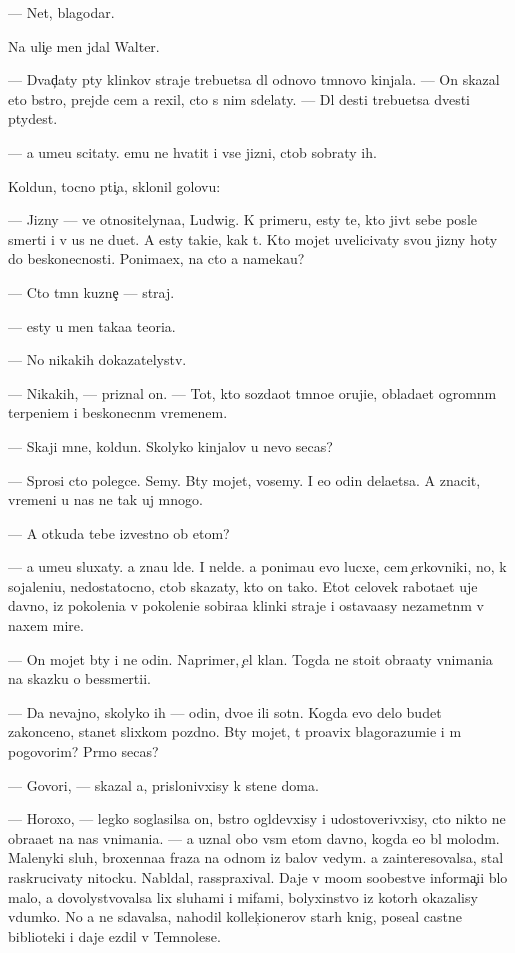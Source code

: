 \documentclass[10pt]{book}
\begin{document}
— Net, blagodar{\iu}.

Na uli{\c}e men{\ia} jdal Walter.

— Dvad{\c}aty p{\ia}ty klinkov straje{\y} trebu{\y}etsa dl{\ia} odnovo t{\e}mnovo kinjala. — On skazal eto b{\yi}stro, prejde cem {\y}a rexil, cto s nim sdelaty. — Dl{\ia} des{\ia}ti trebu{\y}etsa dvesti p{\ia}tydes{\ia}t.

— {\Y}a ume{\y}u scitaty. {\Y}emu ne hvatit i vse{\y} jizni, ctob{\yi} sobraty ih.

Koldun, tocno pti{\c}a, sklonil golovu:

— Jizny — ve{\x} otnositelyna{\y}a, Ludwig. K primeru, {\y}esty te, kto jiv{\e}t sebe posle smerti i v us ne du{\y}et. A {\y}esty taki{\y}e, kak t{\yi}. Kto mojet uvelicivaty svo{\y}u jizny hoty do beskonecnosti. Ponima{\y}ex, na cto {\y}a nameka{\y}u?

— Cto t{\e}mn{\yi}{\y} kuzne{\c} — straj.

— {\Y}esty u men{\ia} taka{\y}a teori{\y}a.

— No nikakih dokazatelystv.

— Nikakih, — priznal on. — Tot, kto sozda{\y}ot t{\e}mno{\y}e oruji{\y}e, oblada{\y}et ogromn{\yi}m terpeni{\y}em i beskonecn{\yi}m vremenem.

— Skaji mne, koldun. Skolyko kinjalov u nevo se{\y}cas?

— Sprosi cto polegce. Semy. B{\yi}ty mojet, vosemy. I {\y}e{\x}o odin dela{\y}etsa. A znacit, vremeni u nas ne tak uj mnogo.

— A otkuda tebe izvestno ob etom?

— {\Y}a ume{\y}u sluxaty. {\Y}a zna{\y}u l{\iu}de{\y}. I nel{\iu}de{\y}. {\Y}a ponima{\y}u {\y}evo lucxe, cem {\c}erkovniki, no, k sojaleni{\y}u, nedostatocno, ctob{\yi} skazaty, kto on tako{\y}. Etot celovek rabota{\y}et uje davno, iz pokoleni{\y}a v pokoleni{\y}e sobira{\y}a klinki straje{\y} i ostava{\y}asy nezametn{\yi}m v naxem mire.

— On mojet b{\yi}ty i ne odin. Naprimer, {\c}el{\yi}{\y} klan. Togda ne sto{\y}it obra{\x}aty vnimani{\y}a na skazku o bessmerti{\y}i.

— Da nevajno, skolyko ih — odin, dvo{\y}e ili sotn{\ia}. Kogda {\y}evo delo budet zakonceno, stanet slixkom pozdno. B{\yi}ty mojet, t{\yi} pro{\y}avix blagorazumi{\y}e i m{\yi} pogovorim? Pr{\ia}mo se{\y}cas?

— Govori, — skazal {\y}a, prislonivxisy k stene doma.

— Horoxo, — legko soglasilsa on, b{\yi}stro ogl{\ia}devxisy i udostoverivxisy, cto nikto ne obra{\x}a{\y}et na nas vnimani{\y}a. — {\Y}a uznal obo vs{\e}m etom davno, kogda {\y}e{\x}o b{\yi}l molod{\yi}m. Malenyki{\y} sluh, broxenna{\y}a fraza na odnom iz balov vedym. {\Y}a zainteresovalsa, stal raskrucivaty nitocku. Nabl{\iu}dal, rasspraxival. Daje v mo{\y}om soob{\x}estve informa{\c}i{\y}i b{\yi}lo malo, {\y}a dovolystvovalsa lix sluhami i mifami, bolyxinstvo iz kotor{\yi}h okazalisy v{\yi}dumko{\y}. No {\y}a ne sdavalsa, nahodil kollek{\c}ionerov star{\yi}h knig, pose{\x}al castn{\yi}{\y}e biblioteki i daje {\y}ezdil v Temnoles{\y}e.
\end{document}
